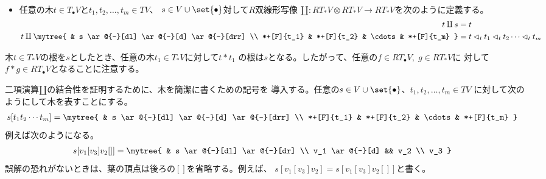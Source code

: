 \begin{itemize}
\begin{equation}
\begin{split}
{		}
		\end{split}\end{equation} %
		\item 任意の木$t\in T_\bullet V$と$t_1,t_2,\dots,t_m\in TV$、
		$s\in V\cup\set{\bullet}$対して$R$双線形写像
		$\amalg:RT_*V\otimes RT_*V\to RT_*V$を次のように定義する。
		\begin{equation}\begin{split} %
			t\amalg s &= t \\
			t\amalg \mytree{
				& s \ar@{-}[dl] \ar@{-}[d] \ar@{-}[drr] \\
				*+[F]{t_1} & *+[F]{t_2} & \cdots & *+[F]{t_m}
			} &= t\lhd_t t_1\lhd_t t_2\cdots \lhd_t t_m \\
		\end{split}\end{equation} %
	\end{itemize} %
	木$t\in T_*V$の根を$s$としたとき、任意の木$t_1\in T_*V$に対して$t*t_1$
	の根は$s$となる。したがって、任意の$f\in RT_\bullet V,\;g\in RT_*V$に
	対して$f*g\in RT_\bullet V$となることに注意する。

	二項演算$\amalg$の結合性を証明するために、木を簡潔に書くための記号を
	導入する。任意の$s\in V\cup\set{\bullet}$、$t_1,t_2,\dots,t_m\in TV$
	に対して次のようにして木を表すことにする。
	\begin{equation}\begin{split} %
		s[t_1t_2\cdots t_m] &= \mytree {
			& s \ar@{-}[dl] \ar@{-}[d] \ar@{-}[drr] \\
			*+[F]{t_1} & *+[F]{t_2} & \cdots & *+[F]{t_m}
		}
	\end{split}\end{equation} %
	例えば次のようになる。
	\begin{equation}\begin{split} %
		s[v_1[v_3]v_2[]] &= \mytree {
			& s \ar@{-}[dl] \ar@{-}[dr] \\
			v_1 \ar@{-}[d] && v_2 \\
			v_3
		}
	\end{split}\end{equation} %
	誤解の恐れがないときは、葉の頂点は後ろの$[]$を省略する。例えば、
	$s[v_1[v_3]v_2]=s[v_1[v_3]v_2[]]$と書く。

